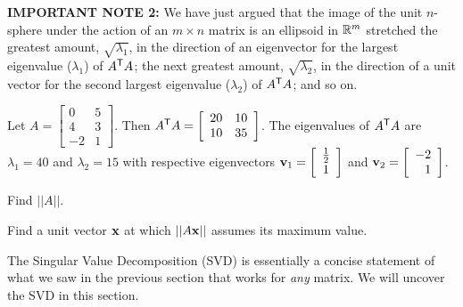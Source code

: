 \noindent \textbf{IMPORTANT NOTE 2:} We have just argued that the image of the unit $n$-sphere under the action of an $m \times n$ matrix is an ellipsoid in $\mathbb{R}^m$ stretched the greatest amount, $\sqrt{\lambda_1}$, in the direction of an eigenvector for the largest eigenvalue ($\lambda_1$) of $A^{\mathsf{T}}A$; the next greatest amount, $\sqrt{\lambda_2}$, in the direction of a unit vector for the second largest eigenvalue ($\lambda_2$) of $A^{\mathsf{T}}A$; and so on.


\begin{activity}  Let $A = \left[ \begin{array}{rc} 0&5\\ 4&3 \\ -2&1\end{array} \right].$ Then $A^{\mathsf{T}}A = \left[ \begin{array}{cc} 20&10\\ 10&35\end{array}
 \right]$. The eigenvalues of $A^{\mathsf{T}}A$ are $\lambda_1 = 40$ and $\lambda_2 = 15$ with respective eigenvectors $\mathbf{v}_1 = \left[ \begin{array}{c} \frac{1}{2} \\ 1 \end{array} \right]$ and $\mathbf{v}_2 = \left[ \begin{array}{r} -2 \\ 1 \end{array} \right]$.
 	\ba
	\item Find $||A||$.
	
	\item Find a unit vector $\mathbf{x}$ at which $||A\mathbf{x}||$ assumes its maximum value.
	
	\ea
\end{activity}


	
	

	


\label{sec:svd}

The Singular Value Decomposition (SVD) is essentially a concise statement of what we saw in the previous section that works for \emph{any} matrix. We will uncover the SVD in this section.

